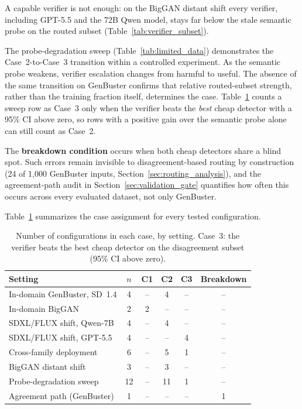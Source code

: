 \documentclass{ieeeaccess}
\begin{document}
A capable verifier is not enough: on the BigGAN distant shift every verifier, including GPT-5.5 and the 72B Qwen model, stays far below the stale semantic probe on the routed subset (Table~\ref{tab:verifier_subset}).

The probe-degradation sweep (Table~\ref{tab:limited_data}) demonstrates the
Case~2-to-Case~3 transition within a controlled experiment. As the semantic probe
weakens, verifier escalation changes from harmful to useful. The absence of the same
transition on GenBuster confirms that relative routed-subset strength, rather than the
training fraction itself, determines the case. Table~\ref{tab:case_mapping} counts a sweep row as Case~3 only when the verifier beats the \emph{best} cheap detector with a 95\% CI above zero, so rows with a positive gain over the semantic probe alone can still count as Case~2.

The \textbf{breakdown condition} occurs when both cheap detectors share a blind spot.
Such errors remain invisible to disagreement-based routing by construction
(24 of 1{,}000 GenBuster inputs, Section~\ref{sec:routing_analysis}), and the agreement-path audit in
Section~\ref{sec:validation_gate} quantifies how often this occurs across every
evaluated dataset, not only GenBuster.

Table~\ref{tab:case_mapping} summarizes the case assignment for every tested configuration.

\begin{table}[h]
\centering
\footnotesize
\setlength{\tabcolsep}{4pt}
\caption{Number of configurations in each case, by setting. Case~3: the verifier beats the best cheap detector on the disagreement subset (95\% CI above zero).}
\label{tab:case_mapping}
\begin{tabular}{lccccc}
\toprule
Setting & $n$ & C1 & C2 & C3 & Breakdown\\
\midrule
In-domain GenBuster, SD~1.4 & 4 & -- & 4 & -- & -- \\
In-domain BigGAN & 2 & 2 & -- & -- & -- \\
SDXL/FLUX shift, Qwen-7B & 4 & -- & 4 & -- & -- \\
SDXL/FLUX shift, GPT-5.5 & 4 & -- & -- & 4 & -- \\
Cross-family deployment & 6 & -- & 5 & 1 & -- \\
BigGAN distant shift & 3 & -- & 3 & -- & -- \\
Probe-degradation sweep & 12 & -- & 11 & 1 & -- \\
Agreement path (GenBuster) & 1 & -- & -- & -- & 1 \\
\bottomrule
\end{tabular}
\end{table}
\end{document}
